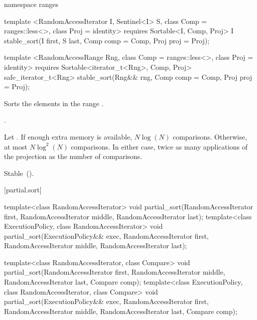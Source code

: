 \begin{addedblock}
%
\begin{itemdecl}
namespace ranges {
  template <RandomAccessIterator I, Sentinel<I> S, class Comp = ranges::less<>,
            class Proj = identity>
      requires Sortable<I, Comp, Proj>
    I stable_sort(I first, S last, Comp comp = Comp{}, Proj proj = Proj{});

  template <RandomAccessRange Rng, class Comp = ranges::less<>, class Proj = identity>
      requires Sortable<iterator_t<Rng>, Comp, Proj>
    safe_iterator_t<Rng> stable_sort(Rng&& rng, Comp comp = Comp{}, Proj proj = Proj{});
}
\end{itemdecl}

\begin{itemdescr}
\pnum
\effects
Sorts the elements in the range .

\pnum
\returns {}.

\pnum
\complexity
Let .
If enough extra memory is available, $N \log(N)$ comparisons.
Otherwise, at most $N \log^2(N)$ comparisons.
In either case, twice as many applications of the projection as the number of
comparisons.

\pnum
\remarks Stable~().
\end{itemdescr}
\end{addedblock}

[partial.sort]{}

%
\begin{itemdecl}
template<class RandomAccessIterator>
  void partial_sort(RandomAccessIterator first,
                    RandomAccessIterator middle,
                    RandomAccessIterator last);
template<class ExecutionPolicy, class RandomAccessIterator>
  void partial_sort(ExecutionPolicy&& exec,
                    RandomAccessIterator first,
                    RandomAccessIterator middle,
                    RandomAccessIterator last);

template<class RandomAccessIterator, class Compare>
  void partial_sort(RandomAccessIterator first,
                    RandomAccessIterator middle,
                    RandomAccessIterator last,
                    Compare comp);
template<class ExecutionPolicy, class RandomAccessIterator, class Compare>
  void partial_sort(ExecutionPolicy&& exec,
                    RandomAccessIterator first,
                    RandomAccessIterator middle,
                    RandomAccessIterator last,
                    Compare comp);

\end{itemdecl}

